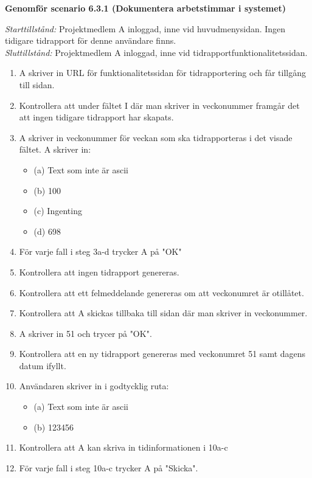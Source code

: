 \documentclass[a4paper]{article}
\begin{document}
\begin{ST}




\item
\textbf{Genomför scenario 6.3.1 (Dokumentera arbetstimmar i systemet)}

\emph{Starttillstånd:} Projektmedlem A inloggad, inne vid huvudmenysidan. Ingen tidigare tidrapport för denne användare finns.\\
\emph{Sluttillstånd:} Projektmedlem A inloggad, inne vid tidrapportfunktionalitetssidan.\\

\begin{enumerate}
\item A skriver in URL för funktionalitetssidan för tidrapportering och får tillgång till sidan.
\item Kontrollera att under fältet I där man skriver in veckonummer framgår det att ingen tidigare tidrapport har skapats.
\item A skriver in veckonummer för veckan som ska tidrapporteras i det visade fältet. A skriver in:
\begin{itemize}
\item[] (a) Text som inte är ascii
\item[] (b) 100
\item[] (c) Ingenting
\item[] (d) 698
\end{itemize}
\item För varje fall i steg 3a-d trycker A på "OK"
\item Kontrollera att ingen tidrapport genereras.
\item Kontrollera att ett felmeddelande genereras om att veckonumret är otillåtet.
\item Kontrollera att A skickas tillbaka till sidan där man skriver in veckonummer.
\item A skriver in 51 och trycer på "OK".
\item Kontrollera att en ny tidrapport genereras med veckonumret 51 samt dagens datum ifyllt.
\item Användaren skriver in i godtycklig ruta:
\begin{itemize}
\item[] (a) Text som inte är ascii
\item[] (b) 123456
\end{itemize}
\item Kontrollera att A kan skriva in tidinformationen i 10a-c
\item För varje fall i steg 10a-c trycker A på "Skicka". 

\end{enumerate}
\end{ST}
\end{document}
